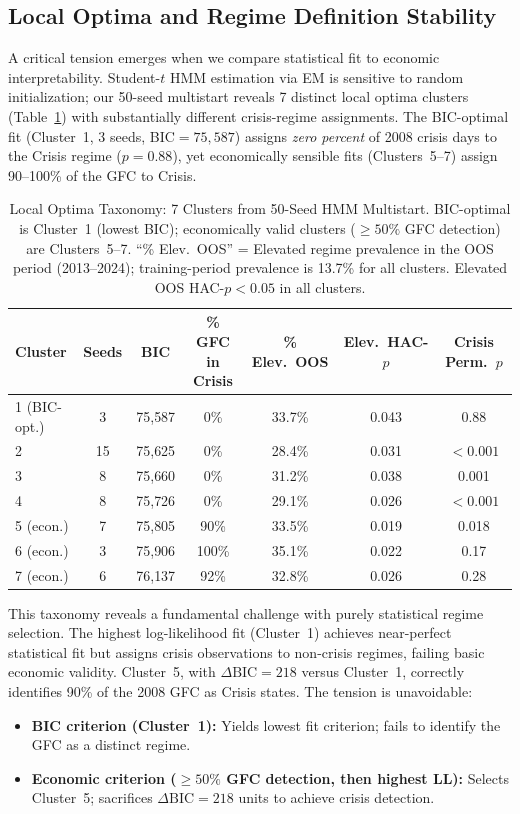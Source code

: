 \documentclass[sigconf,anonymous]{acmart}
\begin{document}
\subsection{Local Optima and Regime Definition Stability}
\label{sec:local_optima}

A critical tension emerges when we compare statistical fit to economic interpretability.
Student-$t$ HMM estimation via EM is sensitive to random initialization; our 50-seed multistart
reveals 7 distinct local optima clusters (Table~\ref{tab:local_optima}) with substantially different crisis-regime assignments.
The BIC-optimal fit (Cluster~1, 3 seeds, BIC$=75{,}587$) assigns \emph{zero percent} of 2008
crisis days to the Crisis regime ($p = 0.88$), yet economically sensible fits (Clusters~5--7)
assign 90--100\% of the GFC to Crisis.

\begin{table}[t]
\centering
\caption{Local Optima Taxonomy: 7 Clusters from 50-Seed HMM Multistart.
BIC-optimal is Cluster~1 (lowest BIC); economically valid clusters ($\geq 50\%$ GFC detection)
are Clusters~5--7. ``\% Elev.\ OOS'' = Elevated regime prevalence in the OOS period (2013--2024);
training-period prevalence is 13.7\% for all clusters. Elevated OOS HAC-$p < 0.05$ in all clusters.}
\label{tab:local_optima}
\scriptsize
\begin{tabular}{@{}lcccccc@{}}
\toprule
Cluster & Seeds & BIC & \% GFC in Crisis & \% Elev.\ OOS & Elev.\ HAC-$p$ & Crisis Perm.\ $p$ \\
\midrule
1 (BIC-opt.) & 3 & 75{,}587 & 0\% & 33.7\% & 0.043 & 0.88 \\
2 & 15 & 75{,}625 & 0\% & 28.4\% & 0.031 & $< 0.001$ \\
3 & 8 & 75{,}660 & 0\% & 31.2\% & 0.038 & 0.001 \\
4 & 8 & 75{,}726 & 0\% & 29.1\% & 0.026 & $< 0.001$ \\
5 (econ.) & 7 & 75{,}805 & 90\% & 33.5\% & 0.019 & 0.018 \\
6 (econ.) & 3 & 75{,}906 & 100\% & 35.1\% & 0.022 & 0.17 \\
7 (econ.) & 6 & 76{,}137 & 92\% & 32.8\% & 0.026 & 0.28 \\
\bottomrule
\end{tabular}
\end{table}

This taxonomy reveals a fundamental challenge with purely statistical regime selection.
The highest log-likelihood fit (Cluster~1) achieves near-perfect statistical fit but
assigns crisis observations to non-crisis regimes, failing basic economic validity.
Cluster~5, with $\Delta\text{BIC} = 218$ versus Cluster~1, correctly identifies 90\% of
the 2008 GFC as Crisis states. The tension is unavoidable:
\begin{itemize}
\item \textbf{BIC criterion (Cluster~1):} Yields lowest fit criterion; fails to identify
the GFC as a distinct regime.
\item \textbf{Economic criterion ($\geq 50\%$ GFC detection, then highest LL):} Selects
Cluster~5; sacrifices $\Delta\text{BIC} = 218$ units to achieve crisis detection.
\end{itemize}
\end{document}
